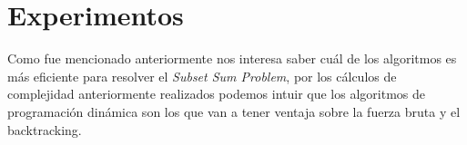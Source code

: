 \documentclass[a4paper]{article}
\begin{document}
\pagebreak

\section{Experimentos}

Como fue mencionado anteriormente nos interesa saber cuál de los algoritmos es más eficiente para resolver el \textit{Subset Sum Problem}, por los cálculos de complejidad anteriormente realizados podemos intuir que los algoritmos de programación dinámica son los que van a tener ventaja sobre la fuerza bruta y el backtracking.
\\
\end{document}
